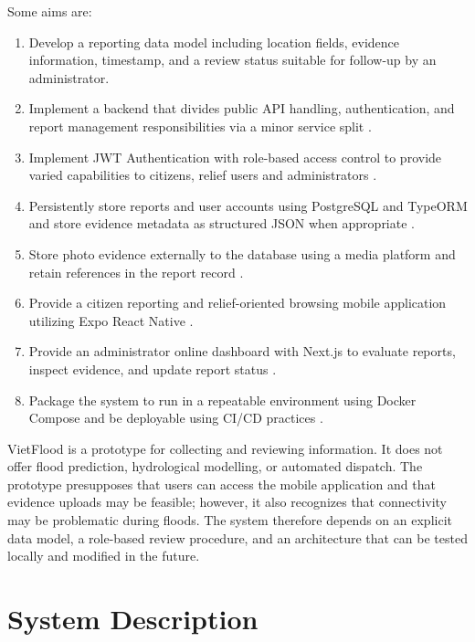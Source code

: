 Some aims are:
\begin{enumerate}
    \item Develop a reporting data model including location fields, evidence information, timestamp, and a review status suitable for follow-up by an administrator.
    \item Implement a backend that divides public API handling, authentication, and report management responsibilities via a minor service split \cite{fowlerLewis2014microservices,dragoni2017microservices,thones2015microservices}.
    \item Implement JWT Authentication with role-based access control to provide varied capabilities to citizens, relief users and administrators \cite{jones2015jwt}.
    \item Persistently store reports and user accounts using PostgreSQL and TypeORM and store evidence metadata as structured JSON when appropriate \cite{typeormDocs,postgresqlJsonDocs}.
    \item Store photo evidence externally to the database using a media platform and retain references in the report record \cite{cloudinaryUploadDocs}.
    \item Provide a citizen reporting and relief-oriented browsing mobile application utilizing Expo React Native \cite{expoDocs,reactNativeDocs}.
    \item Provide an administrator online dashboard with Next.js to evaluate reports, inspect evidence, and update report status \cite{nextjsDocs}.
    \item Package the system to run in a repeatable environment using Docker Compose and be deployable using CI/CD practices \cite{dockerComposeDocs, githubActionsDocs, azureAppServiceContainersDocs, humble2010continuousDelivery, kim2016devopsHandbook}.
\end{enumerate}

VietFlood is a prototype for collecting and reviewing information. It does not offer flood prediction, hydrological modelling, or automated dispatch. The prototype presupposes that users can access the mobile application and that evidence uploads may be feasible; however, it also recognizes that connectivity may be problematic during floods. The system therefore depends on an explicit data model, a role-based review procedure, and an architecture that can be tested locally and modified in the future.

\section{System Description}

